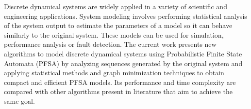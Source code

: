 Discrete dynamical systems are widely applied in a variety of scientific and engineering applications. System modeling involves performing statistical analysis of the system output to estimate the parameters of a model so it can behave similarly to the original system. These models can be used for simulation, performance analysis or fault detection. The current work presents new algorithms to model discrete dynamical systems using Probabilistic Finite State Automata (PFSA) by analyzing sequences generated by the original system and applying statistical methods and graph minimization techniques to obtain compact and efficient PFSA models. Its performance and time complexity are compared with other algorithms present in literature that aim to achieve the same goal. 